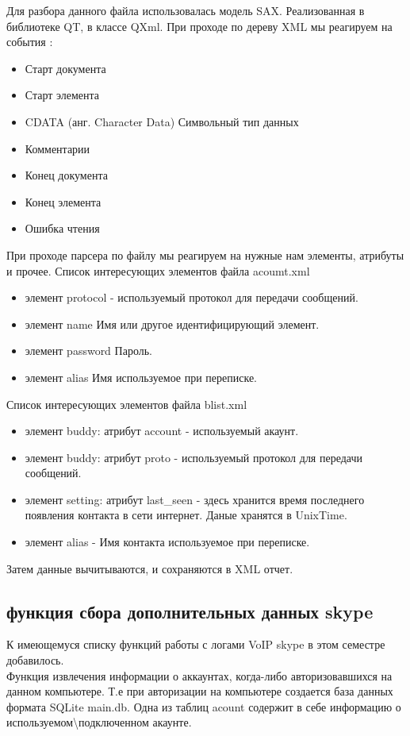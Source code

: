Для разбора данного файла использовалась модель SAX. Реализованная в библиотеке QT, в классе QXml. При проходе по дереву XML мы реагируем на события \cite{qtdoc}:

\begin{itemize}
\item Старт документа
\item Старт элемента
\item CDATA (анг. Character Data) Символьный тип данных
\item Комментарии
\item Конец документа
\item Конец элемента
\item Ошибка чтения
\end{itemize}

При проходе парсера по файлу мы реагируем на нужные нам элементы, атрибуты и прочее.
Список интересующих элементов файла acoumt.xml

\begin{itemize}
\item	элемент protocol - используемый протокол для передачи сообщений.
\item	элемент name 		Имя или другое идентифицирующий элемент.
\item	элемент password	Пароль.
\item	элемент alias		Имя используемое при переписке.
\end{itemize}

Список интересующих элементов файла blist.xml

\begin{itemize}
\item	элемент buddy: атрибут account - используемый акаунт.
\item	элемент buddy: атрибут proto - используемый протокол для передачи сообщений.
\item	элемент setting: атрибут last\_seen - здесь хранится время последнего появления контакта в сети интернет. Даные хранятся в UnixTime.
\item	элемент alias - Имя контакта используемое при переписке.
\end{itemize}

Затем данные вычитываются, и сохраняются в XML отчет.

\subsection{функция сбора дополнительных данных skype}
К имеющемуся списку функций работы с логами VoIP skype в этом семестре добавилось. 
\\Функция извлечения информации о аккаунтах, когда-либо авторизовавшихся на данном компьютере. Т.е при авторизации на компьютере создается база данных формата SQLite main.db. Одна из таблиц acount содержит в себе информацию о используемом\backslash подключенном акаунте. 

